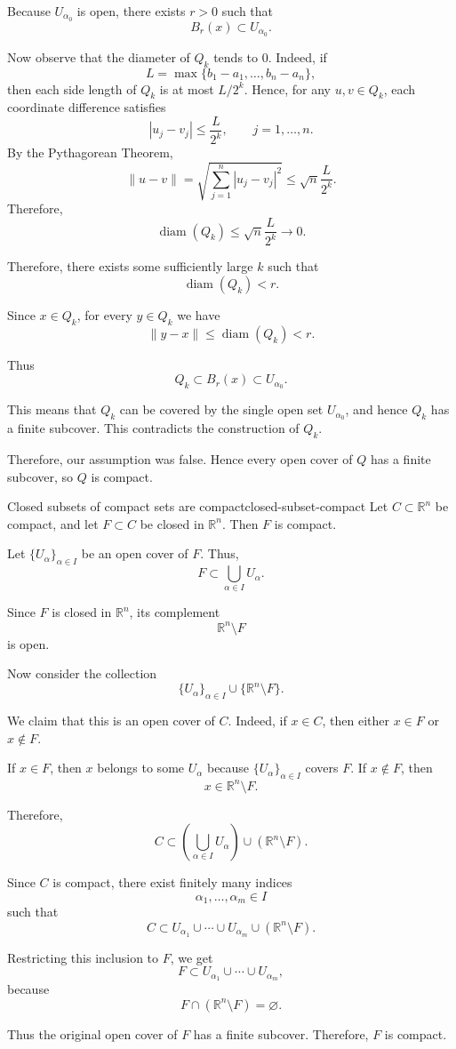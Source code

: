 \documentclass[UTF8,12pt,a4paper]{ctexart}
\makeatletter
\numberwithin{equation}{section}
\newcommand{\currentProofColor}{black}
\renewenvironment{proof}[1][Proof]{%
  \par
  \begingroup
  \edef\proofQEDColor{\currentProofColor}%
  \renewcommand{\qedsymbol}{\textcolor{\proofQEDColor}{$\blacksquare$}}%
  \pushQED{\qed}%
  \normalfont
  \topsep6\p@\@plus6\p@\relax
  \trivlist
  \item[\hskip\labelsep\bfseries\itshape #1\@addpunct{.}]\ignorespaces
}{%
  \popQED
  \endtrivlist
  \@endpefalse
  \endgroup
}
\makeatother
\begin{document}
\begin{proof}
Because $U_{\alpha_0}$ is open, there exists $r>0$ such that
$$
B_r(x)\subset U_{\alpha_0}.
$$

Now observe that the diameter of $Q_k$ tends to $0$. Indeed, if
$$
L = \max\{b_1-a_1,\dots,b_n-a_n\},
$$
then each side length of $Q_k$ is at most $L/2^k$. Hence, for any $u,v\in Q_k$, each coordinate difference satisfies
$$
|u_j-v_j|\le \frac{L}{2^k},\qquad j=1,\dots,n.
$$
By the Pythagorean Theorem,
$$
\|u-v\|
=
\sqrt{\sum_{j=1}^n |u_j-v_j|^2}
\le
\sqrt{n}\frac{L}{2^k}.
$$
Therefore,
$$
\operatorname{diam}(Q_k) \le \sqrt{n}\frac{L}{2^k}\to 0.
$$

Therefore, there exists some sufficiently large $k$ such that
$$
\operatorname{diam}(Q_k)<r.
$$

Since $x\in Q_k$, for every $y\in Q_k$ we have
$$
\|y-x\|\le \operatorname{diam}(Q_k)<r.
$$

Thus
$$
Q_k\subset B_r(x)\subset U_{\alpha_0}.
$$

This means that $Q_k$ can be covered by the single open set $U_{\alpha_0}$, and hence $Q_k$ has a finite subcover. This contradicts the construction of $Q_k$.

Therefore, our assumption was false. Hence every open cover of $Q$ has a finite subcover, so $Q$ is compact.
\end{proof}

\begin{prop}{Closed subsets of compact sets are compact}{closed-subset-compact}
Let $C\subset\mathbb{R}^n$ be compact, and let $F\subset C$ be closed in $\mathbb{R}^n$. Then $F$ is compact.
\end{prop}

\begin{proof}
Let $\{U_\alpha\}_{\alpha\in I}$ be an open cover of $F$. Thus,
$$
F\subset \bigcup_{\alpha\in I}U_\alpha.
$$

Since $F$ is closed in $\mathbb{R}^n$, its complement
$$
\mathbb{R}^n\setminus F
$$
is open.

Now consider the collection
$$
\{U_\alpha\}_{\alpha\in I}\cup\{\mathbb{R}^n\setminus F\}.
$$

We claim that this is an open cover of $C$. Indeed, if $x\in C$, then either $x\in F$ or $x\notin F$.

If $x\in F$, then $x$ belongs to some $U_\alpha$ because $\{U_\alpha\}_{\alpha\in I}$ covers $F$. If $x\notin F$, then
$$
x\in \mathbb{R}^n\setminus F.
$$

Therefore,
$$
C\subset \left(\bigcup_{\alpha\in I}U_\alpha\right)\cup(\mathbb{R}^n\setminus F).
$$

Since $C$ is compact, there exist finitely many indices
$$
\alpha_1,\dots,\alpha_m\in I
$$
such that
$$
C\subset U_{\alpha_1}\cup\cdots\cup U_{\alpha_m}\cup(\mathbb{R}^n\setminus F).
$$

Restricting this inclusion to $F$, we get
$$
F\subset U_{\alpha_1}\cup\cdots\cup U_{\alpha_m},
$$
because
$$
F\cap(\mathbb{R}^n\setminus F)=\varnothing.
$$

Thus the original open cover of $F$ has a finite subcover. Therefore, $F$ is compact.
\end{proof}
\end{document}
